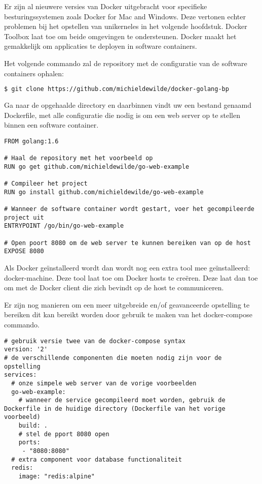 Er zijn al nieuwere versies van Docker uitgebracht voor specifieke besturingssystemen zoals Docker for Mac and Windows. Deze vertonen echter problemen bij het opstellen van unikerneles in het volgende hoofdstuk. Docker Toolbox laat toe om beide omgevingen te ondersteunen. Docker maakt het gemakkelijk om applicaties te deployen in software containers.

\noindent Het volgende commando zal de repository met de configuratie van de software containers ophalen:
\begin{lstlisting}[language=bash]
  $ git clone https://github.com/michieldewilde/docker-golang-bp
\end{lstlisting}

Ga naar de opgehaalde directory en daarbinnen vindt uw een bestand genaamd Dockerfile, met alle configuratie die nodig is om een web server op te stellen binnen een software container.

\begin{lstlisting}[language=docker,caption={Dockerfile},breaklines=true,label={code:docker}]
FROM golang:1.6

# Haal de repository met het voorbeeld op
RUN go get github.com/michieldewilde/go-web-example

# Compileer het project
RUN go install github.com/michieldewilde/go-web-example

# Wanneer de software container wordt gestart, voer het gecompileerde project uit
ENTRYPOINT /go/bin/go-web-example

# Open poort 8080 om de web server te kunnen bereiken van op de host
EXPOSE 8080
\end{lstlisting}

Als Docker geïnstalleerd wordt dan wordt nog een extra tool mee geïnstalleerd: docker-machine. Deze tool laat toe om Docker hosts te creëren. Deze laat dan toe om met de Docker client die zich bevindt op de host te communiceren. 

Er zijn nog manieren om een meer uitgebreide en/of geavanceerde opstelling te bereiken dit kan bereikt worden door gebruik te maken van het docker-compose commando.

\begin{lstlisting}[language=docker-compose,caption={docker-compose.yaml},breaklines=true,label={code:docker-compose}]
# gebruik versie twee van de docker-compose syntax
version: '2'
# de verschillende componenten die moeten nodig zijn voor de opstelling
services:
  # onze simpele web server van de vorige voorbeelden
  go-web-example:
    # wanneer de service gecompileerd moet worden, gebruik de Dockerfile in de huidige directory (Dockerfile van het vorige voorbeeld)
    build: .
    # stel de pport 8080 open
    ports:
     - "8080:8080"
  # extra component voor database functionaliteit
  redis:
    image: "redis:alpine"
\end{lstlisting}

